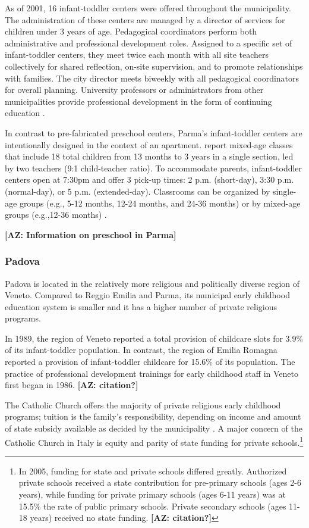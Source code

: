 As of 2001, 16 infant-toddler centers were offered throughout the municipality. The administration of these centers are managed by a director of services for children under 3 years of age. Pedagogical coordinators perform both administrative and professional development roles. Assigned to a specific set of infant-toddler centers, they meet twice each month with all site teachers collectively for shared reflection, on-site supervision, and to promote relationships with families. The city director meets biweekly with all pedagogical coordinators for overall planning. University professors or administrators from other municipalities provide professional development in the form of continuing education \citep{Terzi-Cantarelli_2001_Parma}.

In contrast to pre-fabricated preschool centers, Parma's infant-toddler centers are intentionally designed in the context of an apartment. \citet{Terzi-Cantarelli_2001_Parma} report mixed-age classes that include 18 total children from 13 months to 3 years in a single section, led by two teachers (9:1 child-teacher ratio). To accommodate parents, infant-toddler centers open at 7:30pm and offer 3 pick-up times: 2 p.m. (short-day), 3:30 p.m. (normal-day), or 5 p.m. (extended-day). Classrooms can be organized by single-age groups (e.g., 5-12 months, 12-24 months, and 24-36 months) or by mixed-age groups (e.g.,12-36 months) \citep{Majorano-etal_2009_CC-in-P}.

\textbf{[AZ: Information on preschool in Parma]}

\subsubsection{Padova}
Padova is located in the relatively more religious and politically diverse region of Veneto. Compared to Reggio Emilia and Parma, its municipal early childhood education system is smaller and it has a higher number of private religious programs. 

In 1989, the region of Veneto reported a total provision of childcare slots for 3.9\% of its infant-toddler population. In contrast, the region of Emilia Romagna reported a provision of infant-toddler childcare for 15.6\% of its population. The practice of professional development trainings for early childhood staff in Veneto first began in 1986. \textbf{[AZ: citation?]}

The Catholic Church offers the majority of private religious early childhood programs; tuition is the family's responsibility, depending on income and amount of state subsidy available as decided by the municipality \citep{Hohnerlein_2009_Paradox-Public-Preschools}.  A major concern of the Catholic Church in Italy is equity and parity of state funding for private schools.\footnote{In 2005, funding for state and private schools differed greatly. Authorized private schools received a state contribution for pre-primary schools (ages 2-6 years), while funding for private primary schools (ages 6-11 years) was at 15.5\% the rate of public primary schools. Private secondary schools (ages 11-18 years) received no state funding. \textbf{[AZ: citation?]}}

